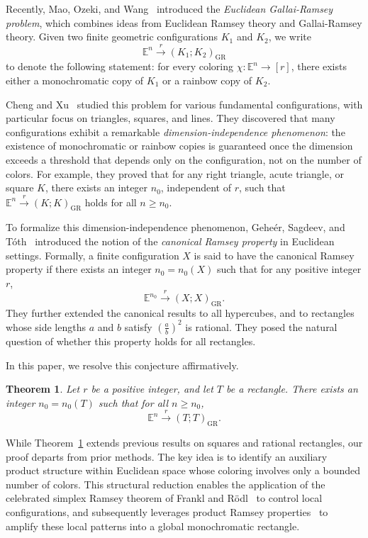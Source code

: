 \documentclass[11pt]{article}
\newtheorem{theorem}{Theorem}[section]
\theoremstyle{definition}
\begin{document}
Recently, Mao, Ozeki, and Wang~\cite{2022arxivEGR} introduced the \emph{Euclidean Gallai-Ramsey problem}, which combines ideas from Euclidean Ramsey theory and Gallai-Ramsey theory. Given two finite geometric configurations \(K_1\) and \(K_2\), we write
\[
\mathbb{E}^n \overset{r}{\rightarrow} (K_1; K_2)_{\mathrm{GR}}
\]
to denote the following statement: for every coloring \(\chi: \mathbb{E}^n \to [r]\), there exists either a monochromatic copy of \(K_1\) or a rainbow copy of \(K_2\). 

Cheng and Xu~\cite{2025DCGChengXu} studied this problem for various fundamental configurations, with particular focus on triangles, squares, and lines. They discovered that many configurations exhibit a remarkable \emph{dimension-independence phenomenon}: the existence of monochromatic or rainbow copies is guaranteed once the dimension exceeds a threshold that depends only on the configuration, not on the number of colors. For example, they proved that for any right triangle, acute triangle, or square \(K\), there exists an integer \(n_0\), independent of \(r\), such that \(\mathbb{E}^n \overset{r}{\rightarrow} (K; K)_{\mathrm{GR}}\) holds for all \(n \ge n_0\).


To formalize this dimension-independence phenomenon, Gehe\'{e}r, Sagdeev, and T\'{o}th~\cite{2024Cano} introduced the notion of the \emph{canonical Ramsey property} in Euclidean settings. Formally, a finite configuration \(X \) is said to have the canonical Ramsey property if there exists an integer \(n_0 = n_0(X)\) such that for any positive integer \(r\),
\[
\mathbb{E}^{n_0} \overset{r}{\rightarrow} (X; X)_{\mathrm{GR}}.
\]
They further extended the canonical results to all hypercubes, and to rectangles whose side lengths \(a\) and \(b\) satisfy \((\frac{a}{b})^2 \) is rational. They posed the natural question of whether this property holds for all rectangles.


In this paper, we resolve this conjecture affirmatively.

\begin{theorem}\label{thm:rectangle}
Let \(r\) be a positive integer, and let \(T\) be a rectangle. There exists an integer \(n_0 = n_0(T)\) such that for all \(n \ge n_0\),
\[
    \mathbb{E}^{n} \overset{r}{\rightarrow} (T; T)_{\mathrm{GR}}.
\]
\end{theorem}
While Theorem~\ref{thm:rectangle} extends previous results on squares and rational rectangles, our proof departs from prior methods. The key idea is to identify an auxiliary product structure within Euclidean space whose coloring involves only a bounded number of colors. This structural reduction enables the application of the celebrated simplex Ramsey theorem of Frankl and R\"{o}dl~\cite{1990JAMS} to control local configurations, and subsequently leverages product Ramsey properties~\cite{1973JCTA} to amplify these local patterns into a global monochromatic rectangle.
\end{document}

